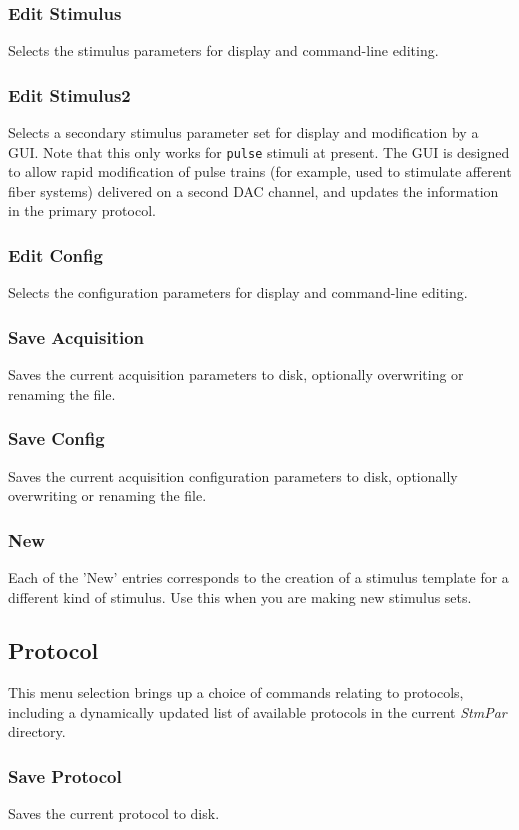 \documentclass[11pt, letterpaper, titlepage]{paper}
\begin{document}
\subsubsection{Edit Stimulus} Selects the stimulus 
parameters for display and command-line editing.
\subsubsection{Edit Stimulus2} Selects a secondary stimulus 
parameter set for display and modification by a GUI. Note that 
this only works for \texttt{pulse} stimuli at present. The GUI is 
designed to allow rapid modification of pulse trains (for example, 
used to stimulate afferent fiber systems) delivered on a second 
DAC channel, and updates the information in the primary protocol.
\subsubsection{Edit Config} Selects the configuration
parameters for display and command-line editing.
\subsubsection{Save Acquisition} Saves the current acquisition 
parameters to disk, optionally overwriting or renaming the file.
\subsubsection{Save Config} Saves the current acquisition configuration 
parameters to disk, optionally overwriting or renaming the file.
\subsubsection{New} Each of the 'New' entries corresponds to the 
creation of a stimulus template for a different kind of stimulus. 
Use this when you are making new stimulus sets.

\subsection{Protocol}
This menu selection brings up a choice of commands relating to 
protocols, including a dynamically updated list of available 
protocols in the current \textsl{StmPar} directory.

\subsubsection{Save Protocol} Saves the current protocol to disk.
\end{document}

